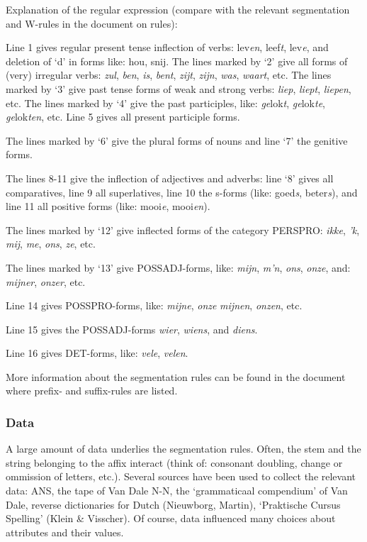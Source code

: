 Explanation of the regular expression (compare with the relevant segmentation 
and W-rules in the document on rules):

Line 1 gives regular present tense inflection of verbs: lev{\em en}, 
leef{\em t}, lev{\em e}, and deletion of `d' in forms like: hou, snij. 
The lines marked by `2' give all forms of (very)
irregular verbs: {\em zul}, {\em ben},  {\em is},  {\em bent},  {\em zijt}, 
{\em zijn},  {\em was},  {\em waart}, etc. The lines marked by `3' give 
past tense forms of weak and strong verbs: {\em liep}, {\em liept},
{\em liepen}, etc. The lines marked by `4' give the past participles, like:
{\em ge}lok{\em t}, {\em ge}lok{\em te}, {\em ge}lok{\em ten}, etc.
Line 5 gives all present participle forms.

The lines marked by `6' give the plural forms of nouns and line `7' the 
genitive forms.

The lines 8-11 give the inflection of adjectives and adverbs:
line `8' gives all comparatives, line 9 all superlatives, line 10 the 
s-forms (like: goed{\em s}, beter{\em s}), and line 11 all positive forms
(like: mooi{\em e}, mooi{\em en}).

The lines marked by `12' give inflected forms of the category PERSPRO:
{\em ikke}, {\em 'k}, {\em mij}, {\em me}, {\em ons}, {\em ze}, etc.

The lines marked by `13' give POSSADJ-forms, like: {\em mijn}, {\em m'n},
{\em ons}, {\em onze}, and: {\em mijner}, {\em onzer}, etc.

Line 14 gives POSSPRO-forms, like: {\em mijne}, {\em onze}
{\em mijnen}, {\em onzen}, etc.

Line 15 gives the POSSADJ-forms {\em wier}, {\em wiens}, and {\em diens}. 

Line 16 gives DET-forms, like: {\em vele}, {\em velen}.

More information about the segmentation rules can be found in the document 
where prefix- and suffix-rules are listed.


\subsubsection{Data}

A large amount of data underlies the segmentation rules. Often, the stem and
the string belonging to the affix interact (think of: consonant doubling,
change or ommission of letters, etc.). Several sources have been used
to collect the relevant data: ANS, the tape of Van Dale N-N, the `grammaticaal
compendium' of Van Dale, reverse dictionaries for Dutch (Nieuwborg, Martin),
`Praktische Cursus Spelling' (Klein \& Visscher). Of course, data influenced
many choices about attributes and their values.

